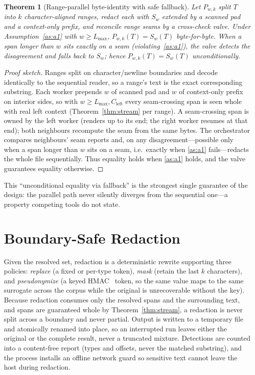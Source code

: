 \documentclass[conference]{IEEEtran}
\newtheorem{theorem}{Theorem}
\begin{document}
\begin{theorem}[Range-parallel byte-identity with safe fallback]\label{thm:par}
Let $P_{w,k}$ split $T$ into $k$ character-aligned ranges, redact each with $S_w$
extended by a scanned pad and a context-only prefix, and reconcile range seams by
a cross-check valve. Under Assumption~\ref{as:a1} with $w\ge L_{\max}$,
$P_{w,k}(T)=S_w(T)$ byte-for-byte. When a span longer than $w$ sits exactly on a
seam (violating~\ref{as:a1}), the valve detects the disagreement and falls back to
$S_w$; hence $P_{w,k}(T)=S_w(T)$ \emph{unconditionally}.
\end{theorem}
\begin{proof}[Proof sketch]
Ranges split on character/newline boundaries and decode identically to the
sequential reader, so a range's text is the exact corresponding substring. Each
worker prepends $w$ of scanned pad and $w$ of context-only prefix on interior
sides, so with $w\ge L_{\max},C_{\mathrm{left}}$ every seam-crossing span is seen
whole with real left context (Theorem~\ref{thm:stream} per range). A seam-crossing
span is owned by the left worker (renders up to its end; the right worker resumes
at that end); both neighbours recompute the seam from the same bytes. The
orchestrator compares neighbours' seam reports and, on any disagreement---possible
only when a span longer than $w$ sits on a seam, i.e.\ exactly when \ref{as:a1}
fails---redacts the whole file sequentially. Thus equality holds when \ref{as:a1}
holds, and the valve guarantees equality otherwise.
\end{proof}

This ``unconditional equality via fallback'' is the strongest single guarantee of
the design: the parallel path never silently diverges from the sequential one---a
property competing tools do not state.

\section{Boundary-Safe Redaction}\label{sec:redaction}

Given the resolved set, redaction is a deterministic rewrite supporting three
policies: \emph{replace} (a fixed or per-type token), \emph{mask} (retain the last
$k$ characters), and \emph{pseudonymize} (a keyed HMAC~\cite{hmac1996} token, so
the same value maps to the same surrogate across the corpus while the original is
unrecoverable without the key). Because redaction consumes only the resolved spans
and the surrounding text, and spans are guaranteed whole by
Theorem~\ref{thm:stream}, a redaction is never split across a boundary and never
partial. Output is written to a temporary file and atomically renamed into place,
so an interrupted run leaves either the original or the complete result, never a
truncated mixture. Detections are counted into a content-free report (types and
offsets, never the matched substring), and the process installs an offline network
guard so sensitive text cannot leave the host during redaction.
\end{document}
